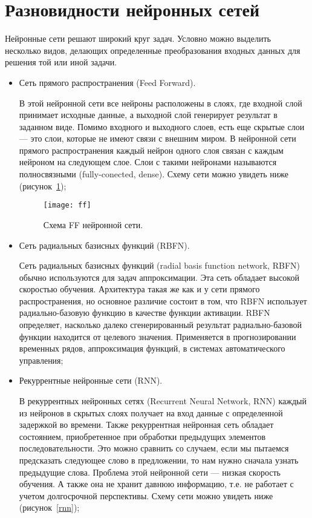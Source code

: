 \documentclass{article}
\begin{document}
	\section{Разновидности нейронных сетей}
	
	Нейронные сети решают широкий круг задач. Условно можно выделить несколько видов, делающих определенные преобразования входных данных для решения той или иной задачи.
	\begin{itemize}
		\item Сеть прямого распространения (Feed Forward). 
	
		В этой нейронной сети все нейроны расположены в слоях, где входной слой принимает исходные данные, а выходной слой генерирует результат в заданном виде. Помимо входного и выходного слоев, есть еще скрытые слои — это слои, которые не имеют связи с внешним миром. В нейронной сети прямого распространения каждый нейрон одного слоя связан с каждым нейроном на следующем слое. Слои с такими нейронами называются полносвязными (fully-conected, dense). Схему сети можно увидеть ниже (рисунок~\ref{ff});
	
		\begin{figure}[H]
			\begin{center}
				\texttt{[image: ff]}
				\caption{Схема FF нейронной сети.} 
				\label{ff}
			\end{center}
		\end{figure}
	
		\item Сеть радиальных базисных функций (RBFN).
	
		Сеть радиальных базисных функций (radial basis function network, RBFN) обычно используются для задач аппроксимации. Эта сеть обладает высокой скоростью обучения. Архитектура такая же как и у сети прямого распространения, но основное различие состоит в том, что RBFN использует радиально-базовую функцию в качестве функции активации. RBFN определяет, насколько далеко сгенерированный результат радиально-базовой функции находится от целевого значения. Применяется в прогнозировании временных рядов, аппроксимация функций, в системах автоматического управления;
	
		\item Рекуррентные нейронные сети (RNN).
	
		В рекуррентных нейронных сетях (Recurrent Neural Network, RNN) каждый из нейронов в скрытых слоях получает на вход данные с определенной задержкой во времени. Также рекуррентная нейронная сеть обладает состоянием, приобретенное при обработки предыдущих элементов последовательности. Это можно сравнить со случаем, если мы пытаемся предсказать следующее слово в предложении, то нам нужно сначала узнать предыдущие слова. Проблема этой нейронной сети — низкая скорость обучения. А также она не хранит давнюю информацию, т.е. не работает с учетом долгосрочной перспективы. Схему сети можно увидеть ниже (рисунок~\ref{rnn});
	

\end{itemize}
\end{document}
